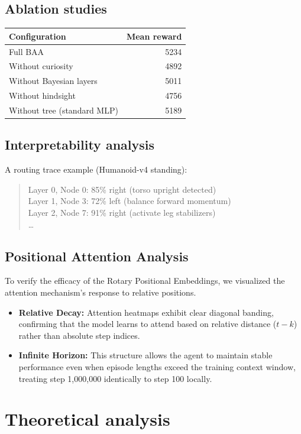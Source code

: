 \documentclass[11pt]{article}
\begin{document}
\subsection{Ablation studies}
\begin{center}
\begin{tabular}{@{}lr@{}}
\toprule
Configuration & Mean reward\\
\midrule
Full BAA & 5234\\
Without curiosity & 4892\\
Without Bayesian layers & 5011\\
Without hindsight & 4756\\
Without tree (standard MLP) & 5189\\
\bottomrule
\end{tabular}
\end{center}

\subsection{Interpretability analysis}
A routing trace example (Humanoid-v4 standing):
\begin{quote}
Layer 0, Node 0: 85\% right (torso upright detected)\\
Layer 1, Node 3: 72\% left (balance forward momentum)\\
Layer 2, Node 7: 91\% right (activate leg stabilizers)\\
\ldots
\end{quote}

\subsection{Positional Attention Analysis}
To verify the efficacy of the Rotary Positional Embeddings, we visualized the attention mechanism's response to relative positions.
\begin{itemize}
    \item \textbf{Relative Decay:} Attention heatmaps exhibit clear diagonal banding, confirming that the model learns to attend based on relative distance ($t-k$) rather than absolute step indices.
    \item \textbf{Infinite Horizon:} This structure allows the agent to maintain stable performance even when episode lengths exceed the training context window, treating step 1,000,000 identically to step 100 locally.
\end{itemize}

\section{Theoretical analysis}\label{sec:theory}
\end{document}
